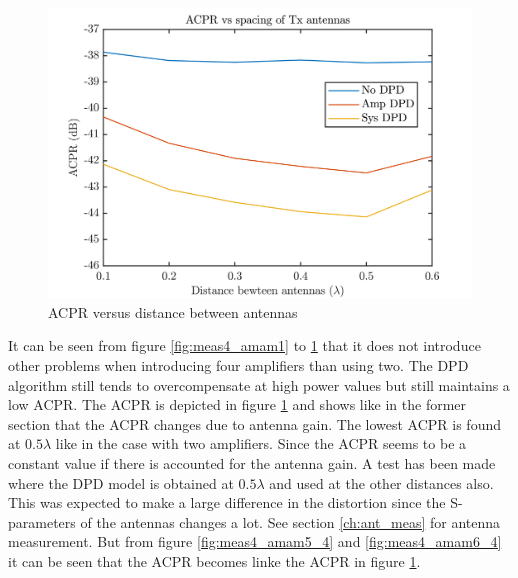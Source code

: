 \begin{figure}[H]
\centering 
\includegraphics[scale = 0.6]{figures/measurement/cree/meas4/acpr_four_ant.png}
\caption{ACPR versus distance between antennas}
\label{fig:meas4_dpd}
\end{figure}

It can be seen from figure \ref{fig:meas4_amam1} to \ref{fig:meas4_dpd} that it does not introduce other problems when introducing four amplifiers than using two. The DPD algorithm still tends to overcompensate at high power values but still maintains a low ACPR. The ACPR is depicted in figure \ref{fig:meas4_dpd} and shows like in the former section that the ACPR changes due to antenna gain. The lowest ACPR is found at $0.5\lambda$ like in the case with two amplifiers. Since the ACPR seems to be a constant value if there is accounted for the antenna gain. A test has been made where the DPD model is obtained at $0.5\lambda$ and used at the other distances also. This was expected to make a large difference in the distortion since the S-parameters of the antennas changes a lot. See section \ref{ch:ant_meas} for antenna measurement. But from figure \ref{fig:meas4_amam5_4} and \ref{fig:meas4_amam6_4} it can be seen that the ACPR becomes linke the ACPR in figure \ref{fig:meas4_dpd}.

